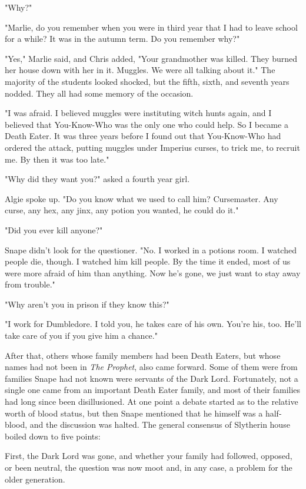 "Why?"

"Marlie, do you remember when you were in third year that I had to leave school for a while? It was in the autumn term. Do you remember why?"

"Yes," Marlie said, and Chris added, "Your grandmother was killed. They burned her house down with her in it. Muggles. We were all talking about it." The majority of the students looked shocked, but the fifth, sixth, and seventh years nodded. They all had some memory of the occasion.

"I was afraid. I believed muggles were instituting witch hunts again, and I believed that{\el} You-Know-Who was the only one who could help. So I became a Death Eater. It was three years before I found out that You-Know-Who had ordered the attack, putting muggles under Imperius curses, to trick me, to recruit me. By then it was too late."

"Why did they want you?" asked a fourth year girl.

Algie spoke up. "Do you know what we used to call him? Cursemaster. Any curse, any hex, any jinx, any potion you wanted, he could do it."

"Did you ever kill anyone?"

Snape didn't look for the questioner. "No. I worked in a potions room. I watched people die, though. I watched him kill people. By the time it ended, most of us were more afraid of him than anything. Now he's gone, we just want to stay away from trouble."

"Why aren't you in prison if they know this?"

"I work for Dumbledore. I told you, he takes care of his own. You're his, too. He'll take care of you if you give him a chance."

After that, others whose family members had been Death Eaters, but whose names had not been in \emph{The Prophet}, also came forward. Some of them were from families Snape had not known were servants of the Dark Lord. Fortunately, not a single one came from an important Death Eater family, and most of their families had long since been disillusioned. At one point a debate started as to the relative worth of blood status, but then Snape mentioned that he himself was a half-blood, and the discussion was halted. The general consensus of Slytherin house boiled down to five points:

First, the Dark Lord was gone, and whether your family had followed, opposed, or been neutral, the question was now moot and, in any case, a problem for the older generation.

